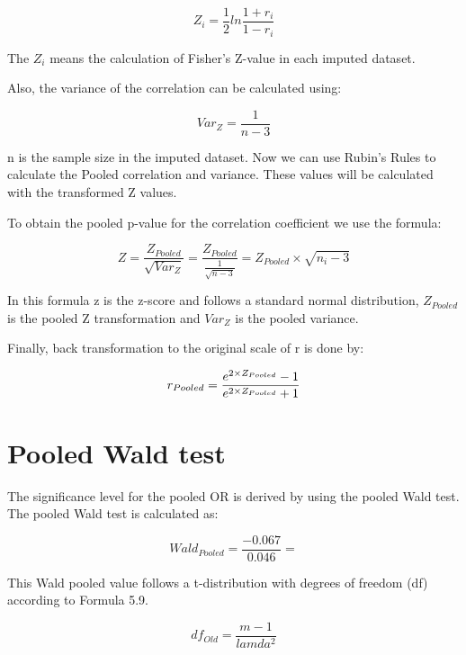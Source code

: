 \documentclass[]{book}
\begin{document}
\begin{equation}
Z_i = \frac{1}{2}ln\frac{1+r_i}{1-r_i}
  \label{eq:cor}
\end{equation}

The \({Z_i}\) means the calculation of Fisher's Z-value in each imputed
dataset.

Also, the variance of the correlation can be calculated using:

\begin{equation}
Var_Z=\frac{1}{n-3}
  \label{eq:var-cor}
\end{equation}

n is the sample size in the imputed dataset. Now we can use Rubin's
Rules to calculate the Pooled correlation and variance. These values
will be calculated with the transformed Z values.

To obtain the pooled p-value for the correlation coefficient we use the
formula:

\begin{equation}
Z=\frac{Z_{Pooled}}{\sqrt{Var_Z}} = \frac{Z_{Pooled}}{\frac{1}{\sqrt{n-3}}}=Z_{Pooled}\times\sqrt{n_i-3}
  \label{eq:z-cor}
\end{equation}

In this formula z is the z-score and follows a standard normal
distribution, \(Z_{Pooled}\) is the pooled Z transformation and
\(Var_Z\) is the pooled variance.

Finally, back transformation to the original scale of r is done by:

\begin{equation}
r_{Pooled} = \frac{e^{2\times\\Z_{Pooled}}-1}{e^{2\times\\Z_{Pooled}}+1}
  \label{eq:exp-cor}
\end{equation}

\chapter{Pooled Wald test}\label{pooled-wald-test}

The significance level for the pooled OR is derived by using the pooled
Wald test. The pooled Wald test is calculated as:

\[Wald_{Pooled} =\frac{-0.067}{0.046}=\]

This Wald pooled value follows a t-distribution with degrees of freedom
(df) according to Formula 5.9.

\[df_{Old} = \frac{m-1}{lamda^2}\]
\end{document}
